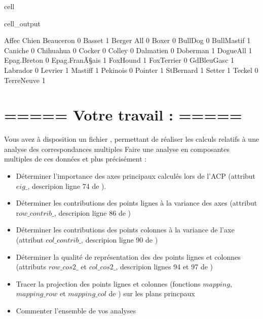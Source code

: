 \documentclass[letterpaper,10pt,french]{sphinxmanual}
\begin{document}
\begin{sphinxuseclass}{cell}
\begin{sphinxuseclass}{cell_output}
\begin{sphinxVerbatim}[commandchars=\\\{\}]
                 Affec\PYGZhy{}  
Chien                    
Beauceron             0  
Basset                1  
Berger All            0  
Boxer                 0  
Bull\PYGZhy{}Dog              0  
Bull\PYGZhy{}Mastif           1  
Caniche               0  
Chihuahua             0  
Cocker                0  
Colley                0  
Dalmatien             0  
Doberman              1  
Dogue\PYGZhy{}All             1  
Epag.\PYGZhy{}Breton          0  
Epag.\PYGZhy{}FranÃ\S{}ais       1  
Fox\PYGZhy{}Hound             1  
Fox\PYGZhy{}Terrier           0  
Gd\PYGZhy{}Bleu\PYGZhy{}Gasc          1  
Labrador              0  
Levrier               1  
Mastiff               1  
Pekinois              0  
Pointer               1  
St\PYGZhy{}Bernard            1  
Setter                1  
Teckel                0  
Terre\PYGZhy{}Neuve           1  
\end{sphinxVerbatim}

\end{sphinxuseclass}
\end{sphinxuseclass}

\section{===== Votre travail : =====}
\label{\detokenize{TP3_AFC_ACM:id1}}
\sphinxAtStartPar
Vous avez à disposition un fichier , permettant de réaliser les calculs relatifs à une analyse des correspondances multiples
Faire une analyse en composantes multiples de ces données et plus précisément :
\begin{itemize}
\item {} 
\sphinxAtStartPar
Déterminer l’importance des axes principaux calculés lors de l’ACP (attribut \(eig\_\), descripion ligne 74 de ).

\item {} 
\sphinxAtStartPar
Déterminer les contributions des points lignes à la variance des axes (attribut r\(ow\_contrib\_\), descripion ligne 86 de )

\item {} 
\sphinxAtStartPar
Déterminer les contributions des points colonnes à la variance de l’axe (attribut \(col\_contrib\_\), descripion ligne 90 de )

\item {} 
\sphinxAtStartPar
Déterminer la qualité de représentation des des points lignes et colonnes (attributs \(row\_cos2\_\) et \(col\_cos2\_\), descripion lignes 94 et 97 de )

\item {} 
\sphinxAtStartPar
Tracer la projection des points lignes et colonnes (fonctions \(mapping\), \(mapping\_row\) et \(mapping\_col\) de ) sur les plans princpaux

\item {} 
\sphinxAtStartPar
Commenter l’ensemble de vos analyses

\end{itemize}
\end{document}
